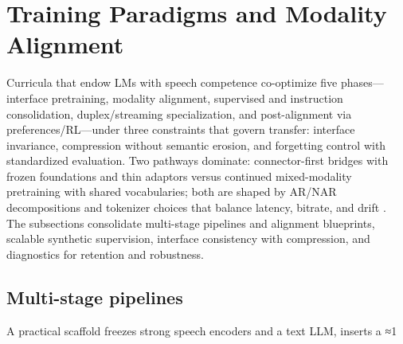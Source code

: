 \documentclass{article}
\begin{document}
\section{Training Paradigms and Modality Alignment} \label{sec:Training Paradigms and Modality Alignment}
Curricula that endow LMs with speech competence co-optimize five phases—interface pretraining, modality alignment, supervised and instruction consolidation, duplex/streaming specialization, and post-alignment via preferences/RL—under three constraints that govern transfer: interface invariance, compression without semantic erosion, and forgetting control with standardized evaluation. Two pathways dominate: connector-first bridges with frozen foundations and thin adaptors versus continued mixed-modality pretraining with shared vocabularies; both are shaped by AR/NAR decompositions and tokenizer choices that balance latency, bitrate, and drift \cite{turetzky2024lastlanguagemodelawarespeechtokenization,wang2023slmbridgethingapbetweenspeechtextfoundat,zeng2024scalingspeechtextpretrainingsyntheticint}. The subsections consolidate multi-stage pipelines and alignment blueprints, scalable synthetic supervision, interface consistency with compression, and diagnostics for retention and robustness.

\subsection{Multi-stage pipelines} \label{subsec:Multi-stage pipelines}
A practical scaffold freezes strong speech encoders and a text LLM, inserts a ≈1%
\end{document}
